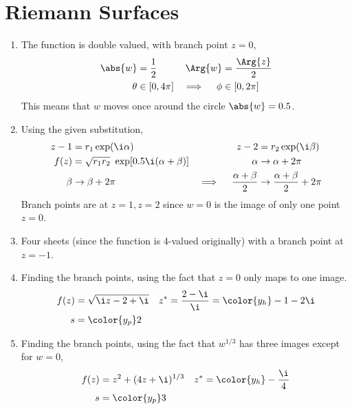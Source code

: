 \section{Riemann Surfaces}

\begin{enumerate}
    \item The function is double valued, with branch point $ z = 0 $,
          \begin{align}
              \abs{w} & = \frac{1}{2} & \Arg{w}             & = \frac{\Arg{z}}{2} \\
              \theta  & \in [0, 4\pi] & \implies \quad \phi & \in [0, 2\pi]
          \end{align}
          This means that $ w $ moves once around the circle $ \abs{w} = 0.5 $.

    \item Using the given substitution,
          \begin{align}
              z - 1  & = r_1 \exp(\i \alpha)                        &
              z - 2  & = r_2 \exp(\i \beta)                           \\
              f(z)   & = \sqrt{r_1r_2}\ \exp[0.5\i(\alpha + \beta)] &
              \alpha & \to \alpha + 2\pi                              \\
              \beta  & \to \beta + 2\pi                             &
              \implies \quad \frac{\alpha + \beta}{2}
                     & \to \frac{\alpha + \beta}{2} + 2\pi
          \end{align}
          Branch points are at $ z = 1, z = 2 $ since $ w = 0 $ is the image of only
          one point $ z = 0 $.

    \item Four sheets (since the function is 4-valued originally) with a branch
          point at $ z = -1 $.

    \item Finding the branch points, using the fact that $ z = 0 $ only maps to one
          image.
          \begin{align}
              f(z) & = \sqrt{\i z - 2 + \i}                     &
              z^*  & = \frac{2 - \i}{\i} = \color{y_h} -1 - 2\i   \\
              s    & = \color{y_p} 2
          \end{align}

    \item Finding the branch points, using the fact that $ w^{1/3} $ has three
          images except for $ w = 0 $,
          \begin{align}
              f(z) & = z^2 + (4z + \i)^{1/3}     &
              z^*  & = \color{y_h} -\frac{\i}{4}   \\
              s    & = \color{y_p} 3
          \end{align}


\end{enumerate}
